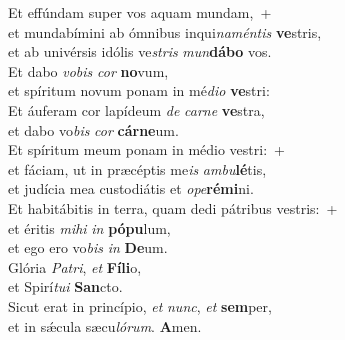 \evenverse Et effúndam super vos aquam mundam,~+\\\evenverse  et mundabímini ab ómnibus inqui\textit{na}\textit{mén}\textit{tis} \textbf{ve}stris,~\*\\
\evenverse et ab univérsis idólis ve\textit{stris} \textit{mun}\textbf{dá}\textbf{bo} vos.\\
\oddverse Et dabo \textit{vo}\textit{bis} \textit{cor} \textbf{no}vum,~\*\\
\oddverse et spíritum novum ponam in mé\textit{di}\textit{o} \textbf{ve}stri:\\
\evenverse Et áuferam cor lapídeum \textit{de} \textit{car}\textit{ne} \textbf{ve}stra,~\*\\
\evenverse et dabo vo\textit{bis} \textit{cor} \textbf{cár}\textbf{ne}um.\\
\oddverse Et spíritum meum ponam in médio vestri:~+\\
\oddverse  et fáciam, ut in præcéptis me\textit{is} \textit{am}\textit{bu}\textbf{lé}tis,~\*\\
\oddverse et judícia mea custodiátis et \textit{o}\textit{pe}\textbf{ré}\textbf{mi}ni.\\
\evenverse Et habitábitis in terra, quam dedi pátribus vestris:~+\\
\evenverse  et éritis \textit{mi}\textit{hi} \textit{in} \textbf{pó}\textbf{pu}lum,~\*\\
\evenverse et ego ero vo\textit{bis} \textit{in} \textbf{De}um.\\
\oddverse Glória \textit{Pa}\textit{tri}, \textit{et} \textbf{Fí}\textbf{li}o,~\*\\
\oddverse et Spirí\textit{tu}\textit{i} \textbf{San}cto.\\
\evenverse Sicut erat in princípio, \textit{et} \textit{nunc}, \textit{et} \textbf{sem}per,~\*\\
\evenverse et in sǽcula sæcu\textit{ló}\textit{rum}. \textbf{A}men.\\
